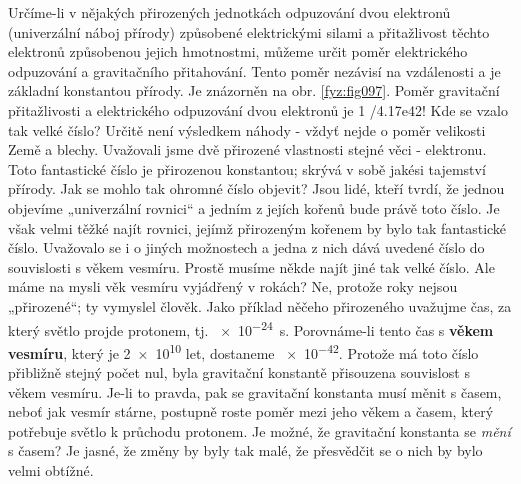 {    Určíme-li v nějakých přirozených jednotkách odpuzování dvou elektronů (univerzální náboj 
    přírody) způsobené elektrickými silami a přitažlivost těchto elektronů způsobenou jejich 
    hmotnostmi, můžeme určit poměr elektrického odpuzování a gravitačního přitahování. Tento poměr 
    nezávisí na vzdálenosti a je základní konstantou přírody. Je znázorněn na obr. 
    \ref{fyz:fig097}. Poměr gravitační přitažlivosti a elektrického odpuzování dvou elektronů je 
    \num{1 /4.17e42}! Kde se vzalo tak velké číslo? Určitě není výsledkem náhody - vždyť nejde o 
    poměr velikosti Země a blechy. Uvažovali jsme dvě přirozené vlastnosti stejné věci - elektronu. 
    Toto fantastické číslo je přirozenou konstantou; skrývá v sobě jakési tajemství přírody. Jak se 
    mohlo tak ohromné číslo objevit? Jsou lidé, kteří tvrdí, že jednou objevíme „univerzální 
    rovnici“ a jedním z jejích kořenů bude právě toto číslo. Je však velmi těžké najít rovnici, 
    jejímž přirozeným kořenem by bylo tak fantastické číslo. Uvažovalo se i o jiných možnostech a 
    jedna z nich dává uvedené číslo do souvislosti s věkem vesmíru. Prostě musíme někde najít jiné 
    tak velké číslo. Ale máme na mysli věk vesmíru vyjádřený v rokách? Ne, protože roky nejsou 
    „přirozené“; ty vymyslel člověk. Jako příklad něčeho přirozeného uvažujme čas, za který světlo 
    projde protonem, tj. \SI{e-24}{\s}. Porovnáme-li tento čas s \textbf{věkem vesmíru}, který je 
    \num{2e10} let, dostaneme \num{e-42}. Protože má toto číslo přibližně stejný počet nul, byla 
    gravitační konstantě přisouzena souvislost s věkem vesmíru. Je-li to pravda, pak se gravitační 
    konstanta musí měnit s časem, neboť jak vesmír stárne, postupně roste poměr mezi jeho věkem a 
    časem, který potřebuje světlo k průchodu protonem. Je možné, že gravitační konstanta se 
    \emph{mění} s časem? Je jasné, že změny by byly tak malé, že přesvědčit se o nich by bylo velmi 
    obtížné.
    
}
